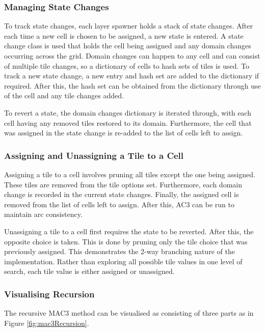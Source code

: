 \subsubsection{Managing State Changes}
To track state changes, each layer spawner holds a stack of state changes. After each time a new cell is chosen to be assigned, a new state is entered. A state change class is used that holds the cell being assigned and any domain changes occurring across the grid. Domain changes can happen to any cell and can consist of multiple tile changes, so a dictionary of cells to hash sets of tiles is used. To track a new state change, a new entry and hash set are added to the dictionary if required. After this, the hash set can be obtained from the dictionary through use of the cell and any tile changes added.


To revert a state, the domain changes dictionary is iterated through, with each cell having any removed tiles restored to its domain. Furthermore, the cell that was assigned in the state change is re-added to the list of cells left to assign.

\subsubsection{Assigning and Unassigning a Tile to a Cell}
Assigning a tile to a cell involves pruning all tiles except the one being assigned. These tiles are removed from the tile options set. Furthermore, each domain change is recorded in the current state changes. Finally, the assigned cell is removed from the list of cells left to assign. After this, AC3 can be run to maintain arc consistency.


Unassigning a tile to a cell first requires the state to be reverted. After this, the opposite choice is taken. This is done by pruning only the tile choice that was previously assigned. This demonstrates the 2-way branching nature of the implementation. Rather than exploring all possible tile values in one level of search, each tile value is either assigned or unassigned.

\subsubsection{Visualising Recursion}
The recursive MAC3 method can be visualised as consisting of three parts as in Figure \ref{fig:mac3Recursion}.

